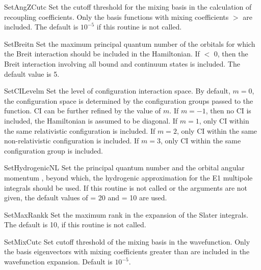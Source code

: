 \begin{fundesc}{SetAngZCut}{c}
Set the cutoff threshold for the mixing basis in the calculation of recoupling
coefficients. Only the basis functions with mixing coefficients $>$ are
included. The default is $10^{-5}$ if this routine is not called.
\end{fundesc}

\begin{fundesc}{SetBreit}{n}
Set the maximum principal quantum number of the orbitals for which the
Breit interaction should be included in the Hamiltonian. If  $<$ 0,
then the Breit interaction involving all bound and continuum states is
included. The default value is 5.
\end{fundesc}

\begin{fundesc}{SetCILevel}{m}
Set the level of configuration interaction space. By default, $m=0$, the
configuration space is determined by the configuration groups passed to the
 function. CI can be further refined by the value of $m$. If
$m=-1$, then no CI is included, the Hamiltonian is assumed to be diagonal. If
$m=1$, only CI within the same relativistic configuration is included. If
$m=2$, only CI within the same non-relativistic configuration is included. If
$m=3$, only CI within the same configuration group is included.
\end{fundesc}

\begin{fundesc}{SetHydrogenicNL}{}
Set the principal quantum number  and the orbital angular momentum
, beyond which, the hydrogenic approximation for the E1 multipole
integrals should be used. If this routine is not called or the arguments are not
given, the default values of  = 20 and  = 10 are used.
\end{fundesc}

\begin{fundesc}{SetMaxRank}{k}
Set the maximum rank in the expansion of the Slater integrals. The default is
10, if this routine is not called.
\end{fundesc}

\begin{fundesc}{SetMixCut}{c}
Set cutoff threshold of the mixing basis in the wavefunction. Only the basis
eigenvectors with mixing coefficients greater than  are included in the
wavefunction expansion. Default is $10^{-5}$.
\end{fundesc}

